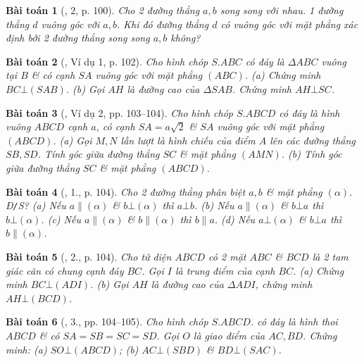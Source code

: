 \documentclass{article}
\numberwithin{equation}{section}
\newtheorem{baitoan}{Bài toán}
\begin{document}
\begin{baitoan}[\cite{SGK_Toan_11_hinh_hoc_co_ban}, 2, p. 100]
	Cho 2 đường thẳng $a,b$ song song với nhau. 1 đường thẳng $d$ vuông góc với $a,b$. Khi đó đường thẳng $d$ có vuông góc với mặt phẳng xác định bởi 2 đường thẳng song song $a,b$ không?
\end{baitoan}

\begin{baitoan}[\cite{SGK_Toan_11_hinh_hoc_co_ban}, Ví dụ 1, p. 102]
	Cho hình chóp $S.ABC$ có đáy là $\Delta ABC$ vuông tại $B$ \& có cạnh $SA$ vuông góc với mặt phẳng $(ABC)$. (a) Chứng minh $BC\bot(SAB)$. (b) Gọi $AH$ là đường cao của $\Delta SAB$. Chứng minh $AH\bot SC$.
\end{baitoan}

\begin{baitoan}[\cite{SGK_Toan_11_hinh_hoc_co_ban}, Ví dụ 2, pp. 103--104]
	Cho hình chóp $S.ABCD$ có đáy là hình vuông $ABCD$ cạnh $a$, có cạnh $SA = a\sqrt{2}$ \& $SA$ vuông góc với mặt phẳng $(ABCD)$. (a) Gọi $M,N$ lần lượt là hình chiếu của điểm $A$ lên các đường thẳng $SB,SD$. Tính góc giữa đường thẳng $SC$ \& mặt phẳng $(AMN)$. (b) Tính góc giữa đường thẳng $SC$ \& mặt phẳng $(ABCD)$.
\end{baitoan}

\begin{baitoan}[\cite{SGK_Toan_11_hinh_hoc_co_ban}, 1., p. 104]
	Cho 2 đường thẳng phân biệt $a,b$ \& mặt phẳng $(\alpha)$. \emph{Đ\texttt{/}S?} (a)  Nếu $a\parallel(\alpha)$ \& $b\bot(\alpha)$ thì $a\bot b$. (b) Nếu $a\parallel(\alpha)$ \& $b\bot a$ thì $b\bot(\alpha)$. (c) Nếu $a\parallel(\alpha)$ \& $b\parallel(\alpha)$ thì $b\parallel a$. (d) Nếu $a\bot(\alpha)$ \& $b\bot a$ thì $b\parallel(\alpha)$.
\end{baitoan}

\begin{baitoan}[\cite{SGK_Toan_11_hinh_hoc_co_ban}, 2., p. 104]
	Cho tứ diện $ABCD$ có 2 mặt $ABC$ \& $BCD$ là 2 tam giác cân có chung cạnh đáy $BC$. Gọi $I$ là trung điểm của cạnh $BC$. (a) Chứng minh $BC\bot(ADI)$. (b) Gọi $AH$ là đường cao của $\Delta ADI$, chứng minh $AH\bot(BCD)$.
\end{baitoan}

\begin{baitoan}[\cite{SGK_Toan_11_hinh_hoc_co_ban}, 3., pp. 104--105]
	Cho hình chóp $S.ABCD$. có đáy là hình thoi $ABCD$ \& có $SA = SB = SC = SD$. Gọi $O$ là giao điểm của $AC,BD$. Chứng minh: (a) $SO\bot(ABCD)$; (b) $AC\bot(SBD)$ \& $BD\bot(SAC)$.
\end{baitoan}
\end{document}
